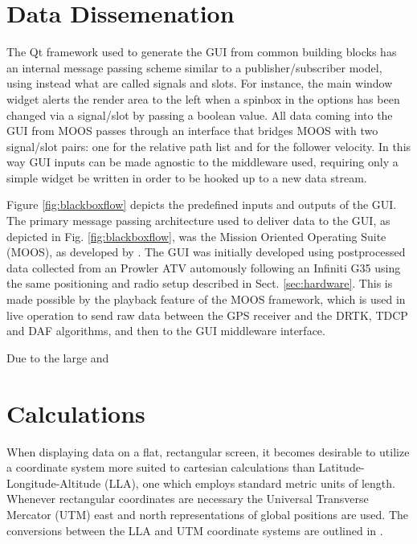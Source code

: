 \documentclass[12pt]{report}
\begin{document}
\section{Data Dissemenation} \label{sec:datadiss}


The Qt framework used to generate the GUI from common building blocks has an internal message passing scheme similar to a publisher/subscriber model, using instead what are called signals and slots. For instance, the main window widget alerts the render area to the left when a spinbox in the options has been changed via a signal/slot by passing a boolean value. All data coming into the GUI from MOOS passes through an interface that bridges MOOS with two signal/slot pairs: one for the relative path list and for the follower velocity. In this way GUI inputs can be made agnostic to the middleware used, requiring only a simple widget be written in order to be hooked up to a new data stream.

Figure \ref{fig:blackboxflow} depicts the predefined inputs and outputs of the GUI. The primary message passing architecture used to deliver data to the GUI, as depicted in Fig. \ref{fig:blackboxflow}, was the Mission Oriented Operating Suite (MOOS), as developed by \cite{moos}. The GUI was initially developed using postprocessed data collected from an Prowler ATV automously following an Infiniti G35 using the same positioning and radio setup described in Sect. \ref{sec:hardware}. This is made possible by the playback feature of the MOOS framework, which is used in live operation to send raw data between the GPS receiver and the DRTK, TDCP and DAF algorithms, and then to the GUI middleware interface.

Due to the large and 

\section{Calculations} \label{sec:guicalc}

When displaying data on a flat, rectangular screen, it becomes desirable to utilize a coordinate system more suited to cartesian calculations than Latitude-Longitude-Altitude (LLA), one which employs standard metric units of length. Whenever rectangular coordinates are necessary the Universal Transverse Mercator (UTM) east and north representations of global positions are used. The conversions between the LLA and UTM coordinate systems are outlined in \cite{projections}.
\end{document}
